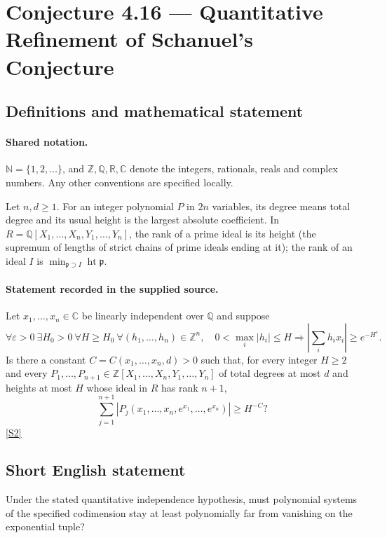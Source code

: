 \documentclass[11pt]{article}
\newcommand{\sref}[2]{\hyperlink{source:#1:#2}{[S#2]}}
\begin{document}
\section{Conjecture 4.16 — Quantitative Refinement of Schanuel's Conjecture}\label{statement}

\subsection{Definitions and mathematical statement}

\paragraph{Shared notation.}$\mathbb N=\{1,2,\ldots\}$, and $\mathbb Z,\mathbb Q,\mathbb R,\mathbb C$ denote the integers, rationals, reals and complex numbers. Any other conventions are specified locally.


Let $n,d\ge1$. For an integer polynomial $P$ in $2n$ variables, its degree means total degree and its usual height is the largest absolute coefficient. In $R=\mathbb Q[X_1,\ldots,X_n,Y_1,\ldots,Y_n]$, the rank of a prime ideal is its height (the supremum of lengths of strict chains of prime ideals ending at it); the rank of an ideal $I$ is $\min_{\mathfrak p\supset I}\operatorname{ht}\mathfrak p$.
\paragraph{Statement recorded in the supplied source.}
Let $x_1,\ldots,x_n\in\mathbb C$ be linearly independent over $\mathbb Q$ and suppose
\[
\forall\varepsilon>0\ \exists H_0>0\ \forall H\ge H_0\ \forall(h_1,\ldots,h_n)\in\mathbb Z^n,
\quad 0<\max_i|h_i|\le H\Longrightarrow
\left|\sum_i h_ix_i\right|\ge e^{-H^{\varepsilon}}.
\]
Is there a constant $C=C(x_1,\ldots,x_n,d)>0$ such that, for every integer $H\ge2$ and every $P_1,\ldots,P_{n+1}\in\mathbb Z[X_1,\ldots,X_n,Y_1,\ldots,Y_n]$ of total degrees at most $d$ and heights at most $H$ whose ideal in $R$ has rank $n+1$,
\[
\sum_{j=1}^{n+1}|P_j(x_1,\ldots,x_n,e^{x_1},\ldots,e^{x_n})|\ge H^{-C}?
\] \sref{statement}{2}

\subsection{Short English statement}
Under the stated quantitative independence hypothesis, must polynomial systems of the specified codimension stay at least polynomially far from vanishing on the exponential tuple?
\end{document}
